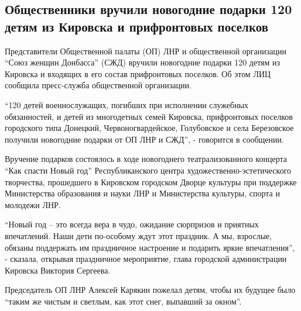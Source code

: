  
 
 
 
 
\subsection{Общественники вручили новогодние подарки 120 детям из Кировска и прифронтовых поселков}
\label{sec:23_12_2021.stz.news.lnr.lug_info.1.deti_kirovsk}


Представители Общественной палаты (ОП) ЛНР и общественной организации \enquote{Союз
женщин Донбасса} (СЖД) вручили новогодние подарки 120 детям из Кировска и
входящих в его состав прифронтовых поселков. Об этом ЛИЦ сообщила пресс-служба
общественной организации.

\enquote{120 детей военнослужащих, погибших при исполнении служебных обязанностей, и
детей из многодетных семей Кировска, прифронтовых поселков городского типа
Донецкий, Червоногвардейское, Голубовское и села Березовское получили
новогодние подарки от ОП ЛНР и СЖД}, - говорится в сообщении.

Вручение подарков состоялось в ходе новогоднего театрализованного концерта \enquote{Как
спасти Новый год} Республиканского центра художественно-эстетического
творчества, прошедшего в Кировском городском Дворце культуры при поддержке
Министерства образования и науки ЛНР и Министерства культуры, спорта и молодежи
ЛНР.

\enquote{Новый год – это всегда вера в чудо, ожидание сюрпризов и приятных впечатлений.
Наши дети по-особому ждут этот праздник. А мы, взрослые, обязаны поддержать им
праздничное настроение и подарить яркие впечатления}, - сказала, открывая
праздничное мероприятие, глава городской администрации Кировска Виктория
Сергеева.

Председатель ОП ЛНР Алексей Карякин пожелал детям, чтобы их будущее было \enquote{таким
же чистым и светлым, как этот снег, выпавший за окном}.


